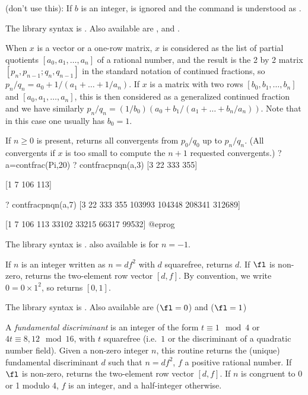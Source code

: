  (don't use this): If $b$ is an integer, 
is ignored and the command is understood as .

The library syntax is .
Also available are ,
 and .

\label{se:contfracpnqn}
When $x$ is a vector or a one-row matrix, $x$
is considered as the list of partial quotients $[a_0,a_1,\dots,a_n]$ of a
rational number, and the result is the 2 by 2 matrix
$[p_n,p_{n-1};q_n,q_{n-1}]$ in the standard notation of continued fractions,
so $p_n/q_n=a_0+1/(a_1+\dots+1/a_n)$. If $x$ is a matrix with two rows
$[b_0,b_1,\dots,b_n]$ and $[a_0,a_1,\dots,a_n]$, this is then considered as a
generalized continued fraction and we have similarly
$p_n/q_n=(1/b_0)(a_0+b_1/(a_1+\dots+b_n/a_n))$. Note that in this case one
usually has $b_0=1$.

If $n \geq 0$ is present, returns all convergents from $p_0/q_0$ up to
$p_n/q_n$. (All convergents if $x$ is too small to compute the $n+1$
requested convergents.)
\bprog
? a=contfrac(Pi,20)
? contfracpnqn(a,3)
[3 22 333 355]

[1  7 106 113]

? contfracpnqn(a,7)
[3 22 333 355 103993 104348 208341 312689]

[1  7 106 113  33102  33215  66317  99532]
@eprog

The library syntax is .
also available is  for $n = -1$.

\label{se:core}
If $n$ is an integer written as
$n=df^2$ with $d$ squarefree, returns $d$. If $\fl$ is non-zero,
returns the two-element row vector $[d,f]$. By convention, we write $0 = 0
\times 1^2$, so  returns $[0,1]$.

The library syntax is .
Also available are  ($\fl = 0$) and
 ($\fl = 1$)

\label{se:coredisc}
A \emph{fundamental discriminant} is an integer of the form $t\equiv 1
\mod 4$ or $4t \equiv 8,12 \mod 16$, with $t$ squarefree (i.e.~$1$ or the
discriminant of a quadratic number field). Given a non-zero integer
$n$, this routine returns the (unique) fundamental discriminant $d$
such that $n=df^2$, $f$ a positive rational number. If $\fl$ is non-zero,
returns the two-element row vector $[d,f]$. If $n$ is congruent to
0 or 1 modulo 4, $f$ is an integer, and a half-integer otherwise.

